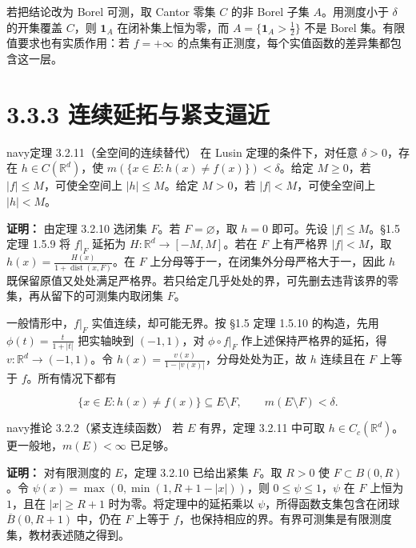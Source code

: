 \documentclass[11pt,a4paper]{article}
\begin{document}
若把结论改为 Borel 可测，取 Cantor 零集 \(C\) 的非 Borel 子集
\(A\)。用测度小于 \(\delta\) 的开集覆盖 \(C\)，则 \(\mathbf1_A\)
在闭补集上恒为零，而 \(A=\{\mathbf1_A>\frac{1}{2}\}\) 不是 Borel
集。有限值要求也有实质作用：若 \(f=+\infty\)
的点集有正测度，每个实值函数的差异集都包含这一层。

\clearpage\section[\S{}3.3.3
连续延拓与紧支逼近]{3.3.3
连续延拓与紧支逼近}\label{ux8fdeux7eedux5ef6ux62d3ux4e0eux7d27ux652fux903cux8fd1}

\begin{sboxenv}{navy}{定理 3.2.11（全空间的连续替代）}
在 Lusin 定理的条件下，对任意 \(\delta>0\)，存在
\(h\in C(\mathbb R^d)\)，使 \(m(\{x\in E:h(x)\ne f(x)\})<\delta\)。给定
\(M\ge0\)，若 \(|f|\le M\)，可使全空间上 \(|h|\le M\)。给定 \(M>0\)，若
\(|f|<M\)，可使全空间上 \(|h|<M\)。

\end{sboxenv}

\textbf{证明：} 由定理 3.2.10 选闭集 \(F\)。若 \(F=\varnothing\)，取
\(h=0\) 即可。先设 \(|f|\le M\)。§1.5 定理 1.5.9 将 \(f|_F\) 延拓为
\(H:\mathbb R^d\to[-M,M]\)。若在 \(F\) 上有严格界 \(|f|<M\)，取
\(h(x)=\frac{H(x)}{1+\operatorname{dist}(x,F)}\)。在 \(F\)
上分母等于一，在闭集外分母严格大于一，因此 \(h\)
既保留原值又处处满足严格界。若只给定几乎处处的界，可先删去违背该界的零集，再从留下的可测集内取闭集
\(F\)。

一般情形中，\(f|_F\) 实值连续，却可能无界。按 §1.5 定理 1.5.10
的构造，先用 \(\phi(t)=\frac{t}{1+|t|}\) 把实轴映到 \((-1,1)\)，对
\(\phi\circ f|_F\) 作上述保持严格界的延拓，得
\(v:\mathbb R^d\to(-1,1)\)。令
\(h(x)=\frac{v(x)}{1-|v(x)|}\)，分母处处为正，故 \(h\) 连续且在 \(F\)
上等于 \(f\)。所有情况下都有

\begin{equation*}
\{x\in E:h(x)\ne f(x)\}\subseteq E\setminus F,\qquad m(E\setminus F)<\delta .
\tag{3.3.2}
\end{equation*}

\begin{sboxenv}{navy}{推论 3.2.2（紧支连续函数）}
若 \(E\) 有界，定理 3.2.11 中可取
\(h\in C_c(\mathbb R^d)\)。更一般地，\(m(E)<\infty\) 已足够。

\end{sboxenv}

\textbf{证明：} 对有限测度的 \(E\)，定理 3.2.10 已给出紧集 \(F\)。取
\(R>0\) 使 \(F\subset B(0,R)\)。令
\(\psi(x)=\max(0,\min(1,R+1-|x|))\)，则 \(0\le\psi\le1\)，\(\psi\) 在
\(F\) 上恒为 \(1\)，且在 \(|x|\ge R+1\) 时为零。将定理中的延拓乘以
\(\psi\)，所得函数支集包含在闭球 \(\overline B(0,R+1)\) 中，仍在 \(F\)
上等于 \(f\)，也保持相应的界。有界可测集是有限测度集，教材表述随之得到。
\end{document}
